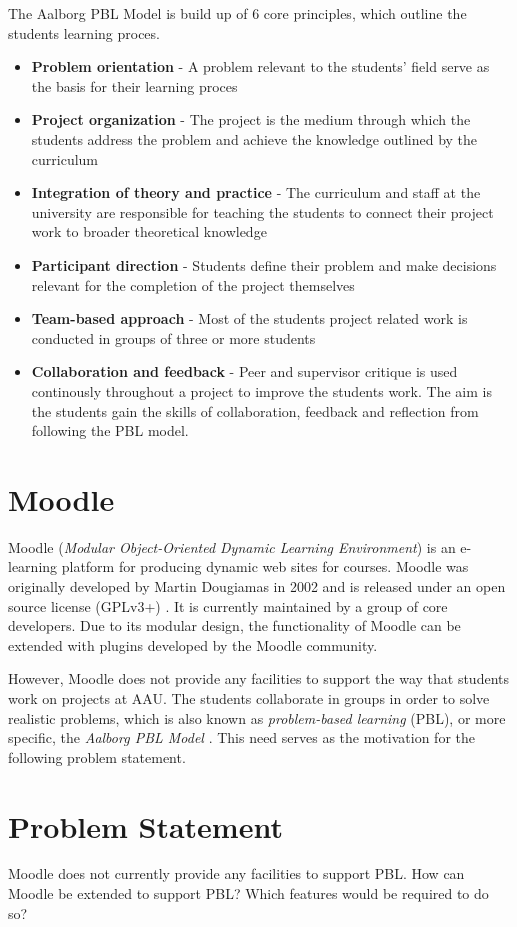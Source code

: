 The Aalborg PBL Model is build up of 6 core principles, which outline the students learning proces.
\begin{itemize}
	\item \textbf{Problem orientation} - A problem relevant to the students' field serve as the basis for their learning proces
	\item \textbf{Project organization} - The project is the medium through which the students address the problem and achieve the knowledge outlined by the curriculum
	\item \textbf{Integration of theory and practice} - The curriculum and staff at the university are responsible for teaching the students to connect their project work to broader theoretical knowledge
	\item \textbf{Participant direction} - Students define their problem and make decisions relevant for the completion of the project themselves
	\item \textbf{Team-based approach} - Most of the students project related work is conducted in groups of three or more students
	\item \textbf{Collaboration and feedback} - Peer and supervisor critique is used continously throughout a project to improve the students work. The aim is the students gain the skills of collaboration, feedback and reflection from following the PBL model. 
\end{itemize}

\section{Moodle}
Moodle (\emph{Modular Object-Oriented Dynamic Learning Environment}) \citep{moodle} is an e-learning platform for producing dynamic web sites for courses. Moodle was originally developed by Martin Dougiamas in 2002 and is released under an open source license (GPLv3+) \citep{gpl}. It is currently maintained by a group of core developers. Due to its modular design, the functionality of Moodle can be extended with plugins developed by the Moodle community.

However, Moodle does not provide any facilities to support the way that students work on projects at AAU. The students collaborate in groups in order to solve realistic problems, which is also known as \emph{problem-based learning} (PBL), or more specific, the \emph{Aalborg PBL Model} \citep{pbl}. This need serves as the motivation for the following problem statement.

\section{Problem Statement}
Moodle does not currently provide any facilities to support PBL. How can Moodle be extended to support PBL? Which features would be required to do so?